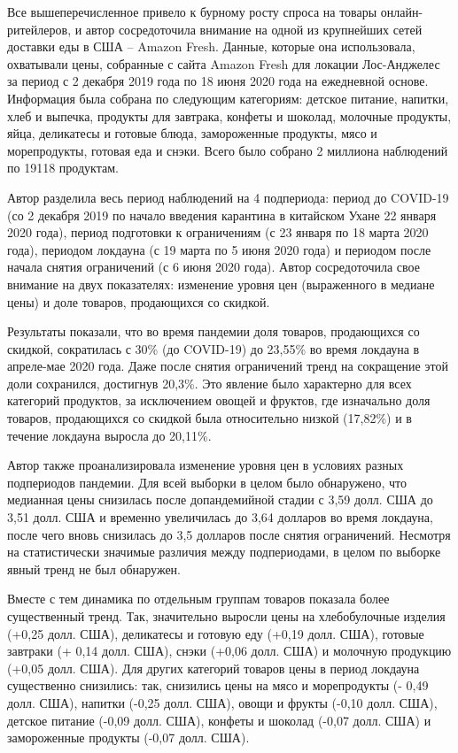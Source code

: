 Все вышеперечисленное привело к бурному росту спроса на товары онлайн-ритейлеров, и автор сосредоточила внимание на одной из крупнейших сетей доставки еды в США – Amazon Fresh. Данные, которые она использовала, охватывали цены, собранные с сайта Amazon Fresh для локации Лос-Анджелес за период с 2 декабря 2019 года по 18 июня 2020 года на ежедневной основе. Информация была собрана по следующим категориям: детское питание, напитки, хлеб и выпечка, продукты для завтрака, конфеты и шоколад, молочные продукты, яйца, деликатесы и готовые блюда, замороженные продукты, мясо и морепродукты, готовая еда и снэки. Всего было собрано 2 миллиона наблюдений по 19118 продуктам.

Автор разделила весь период наблюдений на 4 подпериода: период до COVID-19 (со 2 декабря 2019 по начало введения карантина в китайском Ухане 22 января 2020 года), период подготовки к ограничениям (с 23 января по 18 марта 2020 года), периодом локдауна (с 19 марта по 5 июня 2020 года) и периодом после начала снятия ограничений (с 6 июня 2020 года). Автор сосредоточила свое внимание на двух показателях: изменение уровня цен (выраженного в медиане цены) и доле товаров, продающихся со скидкой.

Результаты показали, что во время пандемии доля товаров, продающихся со скидкой, сократилась с 30\% (до COVID-19) до 23,55\% во время локдауна в апреле-мае 2020 года. Даже после снятия ограничений тренд на сокращение этой доли сохранился, достигнув 20,3\%. Это явление было характерно для всех категорий продуктов, за исключением овощей и фруктов, где изначально доля товаров, продающихся со скидкой была относительно низкой (17,82\%) и в течение локдауна выросла до 20,11\%.

Автор также проанализировала изменение уровня цен в условиях разных подпериодов пандемии. Для всей выборки в целом было обнаружено, что медианная цены снизилась после допандемийной стадии с 3,59 долл. США до 3,51 долл. США и временно увеличилась до 3,64 долларов во время локдауна, после чего вновь снизилась до 3,5 долларов после снятия ограничений. Несмотря на статистически значимые различия между подпериодами, в целом по выборке явный тренд не был обнаружен.

Вместе с тем динамика по отдельным группам товаров показала более существенный тренд. Так, значительно выросли цены на хлебобулочные изделия (+0,25 долл. США), деликатесы и готовую еду (+0,19 долл. США), готовые завтраки (+ 0,14 долл. США), снэки (+0,06 долл. США) и молочную продукцию (+0,05 долл. США). Для других категорий товаров цены в период локдауна существенно снизились: так, снизились цены на мясо и морепродукты (- 0,49 долл. США), напитки (-0,25 долл. США), овощи и фрукты (-0,10 долл. США), детское питание (-0,09 долл. США), конфеты и шоколад (-0,07 долл. США) и замороженные продукты (-0,07 долл. США).

